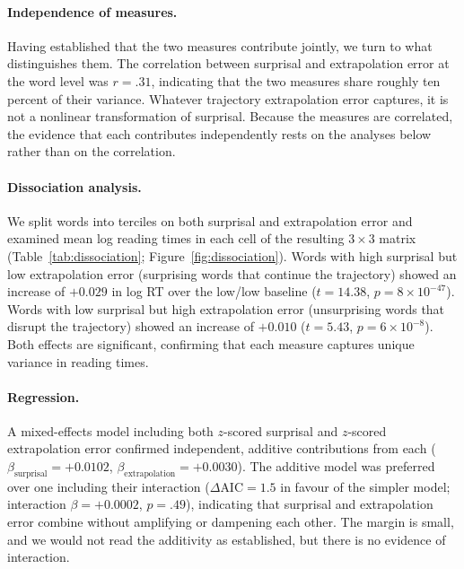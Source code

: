\documentclass[12pt]{article}
\newcommand{\new}[1]{#1}   %
\begin{document}
\paragraph{Independence of measures.} \new{Having established that the two measures contribute jointly, we turn to what distinguishes them.} The correlation between surprisal and extrapolation error at the word level was \new{$r = .31$, indicating that the two measures share roughly ten percent of their variance}. Whatever trajectory extrapolation error captures, it is not a nonlinear transformation of surprisal. \new{Because the measures are correlated, the evidence that each contributes independently rests on the analyses below rather than on the correlation.}

\paragraph{Dissociation analysis.} We split words into terciles on both surprisal and extrapolation error and examined mean log reading times in each cell of the resulting $3 \times 3$ matrix (Table~\ref{tab:dissociation}; Figure~\ref{fig:dissociation}). Words with high surprisal but low extrapolation error (surprising words that continue the trajectory) showed an increase of \new{$+0.029$} in log RT over the low/low baseline (\new{$t = 14.38$, $p = 8 \times 10^{-47}$}). Words with low surprisal but high extrapolation error (unsurprising words that disrupt the trajectory) showed an increase of \new{$+0.010$} (\new{$t = 5.43$, $p = 6 \times 10^{-8}$}). Both effects are significant, confirming that each measure captures unique variance in reading times.

\paragraph{Regression.} A mixed-effects model including both $z$-scored surprisal and $z$-scored extrapolation error confirmed independent\new{, additive contributions from each ($\beta_{\text{surprisal}} = +0.0102$, $\beta_{\text{extrapolation}} = +0.0030$). The additive model was preferred over one including their interaction ($\Delta\text{AIC} = 1.5$ in favour of the simpler model; interaction $\beta = +0.0002$, $p = .49$), indicating that surprisal and extrapolation error combine without amplifying or dampening each other. The margin is small, and we would not read the additivity as established, but there is no evidence of interaction.}
\end{document}
